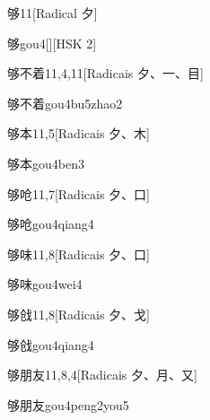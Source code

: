\begin{entry}{够}{11}[Radical ⼣]
  \begin{phonetics}{够}{gou4}[][HSK 2]
  \end{phonetics}
\end{entry}

\begin{entry}{够不着}{11,4,11}[Radicais ⼣、⼀、⽬]
  \begin{phonetics}{够不着}{gou4bu5zhao2}
  \end{phonetics}
\end{entry}

\begin{entry}{够本}{11,5}[Radicais ⼣、⽊]
  \begin{phonetics}{够本}{gou4ben3}
  \end{phonetics}
\end{entry}

\begin{entry}{够呛}{11,7}[Radicais ⼣、⼝]
  \begin{phonetics}{够呛}{gou4qiang4}
  \end{phonetics}
\end{entry}

\begin{entry}{够味}{11,8}[Radicais ⼣、⼝]
  \begin{phonetics}{够味}{gou4wei4}
  \end{phonetics}
\end{entry}

\begin{entry}{够戗}{11,8}[Radicais ⼣、⼽]
  \begin{phonetics}{够戗}{gou4qiang4}
  \end{phonetics}
\end{entry}

\begin{entry}{够朋友}{11,8,4}[Radicais ⼣、⽉、⼜]
  \begin{phonetics}{够朋友}{gou4peng2you5}
  \end{phonetics}
\end{entry}

